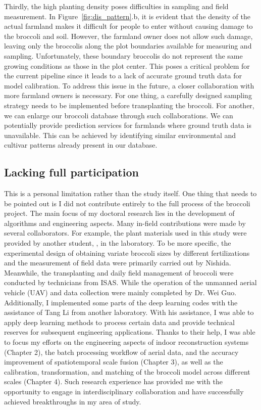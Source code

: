   Thirdly, the high planting density poses difficulties in sampling and field measurement.
  In Figure~\ref{fig:dis_pattern}.b, it is evident that the density of the actual farmland makes it difficult for people to enter without causing damage to the broccoli and soil. 
  However, the farmland owner does not allow such damage, leaving only the broccolis along the plot boundaries available for measuring and sampling. 
  Unfortunately, these boundary broccolis do not represent the same growing conditions as those in the plot center. 
  This poses a critical problem for the current pipeline since it leads to a lack of accurate ground truth data for model calibration.
  To address this issue in the future, a closer collaboration with more farmland owners is necessary. 
  For one thing, a carefully designed sampling strategy needs to be implemented before transplanting the broccoli. 
  For another, we can enlarge our broccoli database through such collaborations.
  We can potentially provide prediction services for farmlands where ground truth data is unavailable. 
  This can be achieved by identifying similar environmental and cultivar patterns already present in our database.

\subsection{Lacking full participation} \label{sec:lackdata}

  This is a personal limitation rather than the study itself.
  One thing that needs to be pointed out is I did not contribute entirely to the full process of the broccoli project. 
  The main focus of my doctoral research lies in the development of algorithms and engineering aspects. 
  Many in-field contributions were made by several collaborators.
  For example, the plant materials used in this study were provided by another student, \mbox{\citet{nishida_estimation_2023}}, in the laboratory. To be more specific, the experimental design of obtaining variate broccoli sizes by different fertilizations and the measurement of field data were primarily carried out by Nishida. 
  Meanwhile, the transplanting and daily field management of broccoli were conducted by technicians from ISAS.
  While the operation of the unmanned aerial vehicle (UAV) and data collection were mainly completed by Dr. Wei Guo.
  Additionally, I implemented some parts of the deep learning codes with the assistance of Tang Li from another laboratory. 
  With his assistance, I was able to apply deep learning methods to process certain data and provide technical reserves for subsequent engineering applications.
  Thanks to their help, I was able to focus my efforts on the engineering aspects of indoor reconstruction systems (Chapter 2), 
  the batch processing workflow of aerial data, and the accuracy improvement of spatiotemporal scale fusion (Chapter 3), 
  as well as the calibration, transformation, and matching of the broccoli model across different scales (Chapter 4).
  Such research experience has provided me with the opportunity to engage in interdisciplinary collaboration and have successfully achieved breakthroughs in my area of study. 

